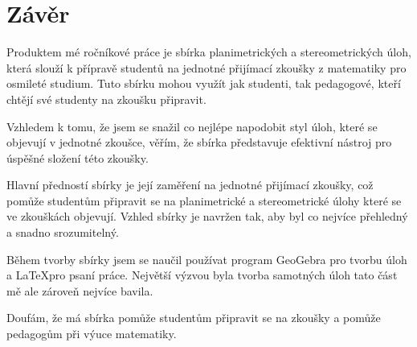 \chapter*{Závěr}
Produktem mé ročníkové práce je sbírka planimetrických a stereometrických úloh, která slouží k přípravě studentů na jednotné přijímací zkoušky z matematiky pro osmileté studium. Tuto sbírku mohou využít jak studenti, tak pedagogové, kteří chtějí své studenty na zkoušku připravit.

Vzhledem k tomu, že jsem se snažil co nejlépe napodobit styl úloh, které se objevují v jednotné zkoušce, věřím, že sbírka představuje efektivní nástroj pro úspěšné složení této zkoušky.

Hlavní předností sbírky je její zaměření na jednotné přijímací zkoušky, což pomůže studentům připravit se na planimetrické a stereometrické úlohy které se ve zkouškách objevují. Vzhled sbírky je navržen tak, aby byl co nejvíce přehledný a snadno srozumitelný.

Během tvorby sbírky jsem se naučil používat program GeoGebra pro tvorbu úloh a \LaTeX pro psaní práce. Největší výzvou byla tvorba samotných úloh tato část mě ale zároveň nejvíce bavila.

Doufám, že má sbírka pomůže studentům připravit se na zkoušky a pomůže pedagogům při výuce matematiky.